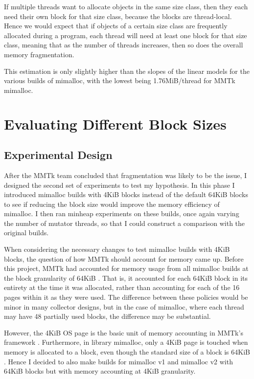 \documentclass{article}
\begin{document}
If multiple threads want to allocate objects in the same size class, then they each need their own block for that size class, because the blocks are thread-local. Hence we would expect that if objects of a certain size class are frequently allocated during a program, each thread will need at least one block for that size class, meaning that as the number of threads increases, then so does the overall memory fragmentation.

This estimation is only slightly higher than the slopes of the linear models for the various builds of mimalloc, with the lowest being 1.76MiB/thread for MMTk mimalloc.

\section{Evaluating Different Block Sizes}
\subsection{Experimental Design}
After the MMTk team concluded that fragmentation was likely to be the issue, I designed the second set of experiments to test my hypothesis. In this phase I introduced mimalloc builds with 4KiB blocks instead of the default 64KiB blocks to see if reducing the block size would improve the memory efficiency of mimalloc. I then ran minheap experiments on these builds, once again varying the number of mutator threads, so that I could construct a comparison with the original builds.

When considering the necessary changes to test mimalloc builds with 4KiB blocks, the question of how MMTk should account for memory came up. Before this project, MMTk had accounted for memory usage from all mimalloc builds at the block granularity of 64KiB \cite{mmtk-core,pr689}. That is, it accounted for each 64KiB block in its entirety at the time it was allocated, rather than accounting for each of the 16 pages within it as they were used. The difference between these policies would be minor in many collector designs, but in the case of mimalloc, where each thread may have 48 partially used blocks, the difference may be substantial.

However, the 4KiB OS page is the basic unit of memory accounting in MMTk's framework \cite{mmtk-core}. Furthermore, in library mimalloc, only a 4KiB page is touched when memory is allocated to a block, even though the standard size of a block is 64KiB \cite{mimalloc}. Hence I decided to also make builds for mimalloc v1 and mimalloc v2 with 64KiB blocks but with memory accounting at 4KiB granularity.
\end{document}
